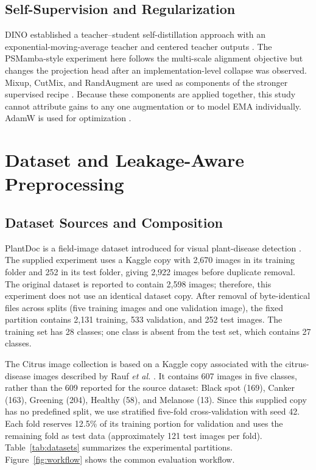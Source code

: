 \documentclass[conference]{IEEEtran}
\begin{document}
\subsection{Self-Supervision and Regularization}
DINO established a teacher--student self-distillation approach with an exponential-moving-average teacher and centered teacher outputs \cite{caron2021dino}. The PSMamba-style experiment here follows the multi-scale alignment objective but changes the projection head after an implementation-level collapse was observed. Mixup, CutMix, and RandAugment are used as components of the stronger supervised recipe \cite{zhang2018mixup,yun2019cutmix,cubuk2020randaugment}. Because these components are applied together, this study cannot attribute gains to any one augmentation or to model EMA individually. AdamW is used for optimization \cite{loshchilov2019adamw}.

\section{Dataset and Leakage-Aware Preprocessing}
\subsection{Dataset Sources and Composition}
PlantDoc is a field-image dataset introduced for visual plant-disease detection \cite{singh2020plantdoc}. The supplied experiment uses a Kaggle copy with 2,670 images in its training folder and 252 in its test folder, giving 2,922 images before duplicate removal. The original dataset is reported to contain 2,598 images; therefore, this experiment does not use an identical dataset copy. After removal of byte-identical files across splits (five training images and one validation image), the fixed partition contains 2,131 training, 533 validation, and 252 test images. The training set has 28 classes; one class is absent from the test set, which contains 27 classes.

The Citrus image collection is based on a Kaggle copy associated with the citrus-disease images described by Rauf \textit{et al.} \cite{rauf2019citrus}. It contains 607 images in five classes, rather than the 609 reported for the source dataset: Black spot (169), Canker (163), Greening (204), Healthy (58), and Melanose (13). Since this supplied copy has no predefined split, we use stratified five-fold cross-validation with seed 42. Each fold reserves 12.5\% of its training portion for validation and uses the remaining fold as test data (approximately 121 test images per fold). Table~\ref{tab:datasets} summarizes the experimental partitions. Figure~\ref{fig:workflow} shows the common evaluation workflow.
\end{document}
